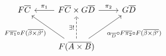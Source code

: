 \documentclass{lmcs}
\theoremstyle{plain}\newtheorem{satz}[thm]{Satz}
\begin{document}
{\begin{figure*}[ht]
\begin{minipage}[b]{0.25\linewidth}
{\[    \]}
\end{minipage}\hspace*{0.2in}
\begin{minipage}[b]{0.25\linewidth}
{\footnotesize \[
      \begin{tikzcd}[row sep = large]
          F\overline{C}
          &F\overline{C} \times G\overline{D}
          \ar[l, "{\pi_1}"'] \ar[r, "{\pi_2}"]
          &G\overline{D}\\
          &F(\overline{A \times B})
          \ar[u, dashed, "{\exists !}"]
          \ar[ul, "{F\ol{\pi_1} \circ F(\overline{\beta \times \beta'})}"]
          \ar[ur, "{\alpha_{\ol{D}} \circ F\ol{\pi_2} \circ F(\overline{\beta \times \beta'})}"']
      \end{tikzcd}
      \]}
\end{minipage}
\end{figure*}


}
\end{document}

